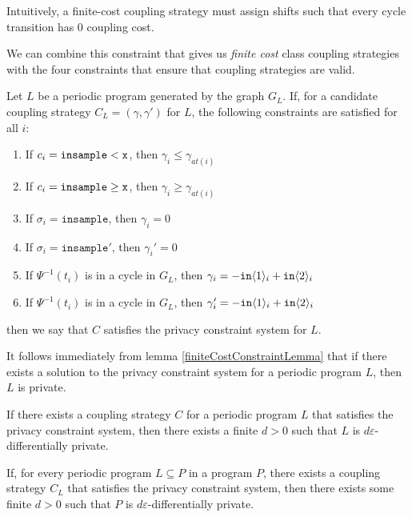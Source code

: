 Intuitively, a finite-cost coupling strategy must assign shifts such that every cycle transition has 0 coupling cost. 

We can combine this constraint that gives us \textit{finite cost} class coupling strategies with the four constraints that ensure that coupling strategies are valid. 

\begin{defn}\label{privacyConstraintSystem}
    Let $L$ be a periodic program generated by the graph $G_L$. If, for a candidate coupling strategy $C_L = (\gamma, \gamma')$ for $L$, the following constraints are satisfied for all $i$: \begin{enumerate}
        \item If $c_i = \lguard[\texttt{x}]$, then $\gamma_i\leq\gamma_{at(i)}$
        \item If $c_i = \gguard[\texttt{x}]$, then $\gamma_i\geq\gamma_{at(i)}$
        \item If $\sigma_i = \texttt{insample}$, then $\gamma_i=0$
        \item If $\sigma_i = \texttt{insample}'$, then $\gamma_i'=0$
        \item If $\Psi^{-1}(t_i)$ is in a cycle in $G_L$, then $\gamma_i = -\texttt{in}\brangle{1}_i+\texttt{in}\brangle{2}_i$
        \item If $\Psi^{-1}(t_i)$ is in a cycle in $G_L$, then $\gamma_i' = -\texttt{in}\brangle{1}_i+\texttt{in}\brangle{2}_i$
    \end{enumerate}
    then we say that $C$ satisfies the privacy constraint system for $L$. 
\end{defn}

It follows immediately from lemma \ref{finiteCostConstraintLemma} that if there exists a solution to the privacy constraint system for a periodic program $L$, then $L$ is private.

\begin{prop}\label{privacyFiniteCostProp}
    If there exists a coupling strategy $C$ for a periodic program $L$ that satisfies the privacy constraint system, then there exists a finite $d>0$ such that $L$ is $d\varepsilon$-differentially private. 
\end{prop}

\begin{cor}\label{svProgramPrivacyCorollary}
    If, for every periodic program $L\subseteq P$ in a program $P$, there exists a coupling strategy $C_L$ that satisfies the privacy constraint system, then there exists some finite $d>0$ such that $P$ is $d\varepsilon$-differentially private.    
\end{cor}

